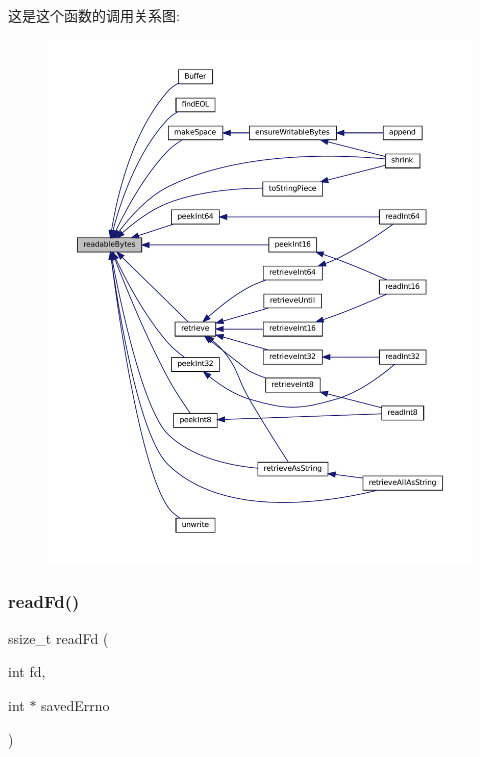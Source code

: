 这是这个函数的调用关系图\+:
\nopagebreak
\begin{figure}[H]
\begin{center}
\leavevmode
\includegraphics[width=350pt]{classmuduo_1_1net_1_1Buffer_afba1d23196411daa43950fdbbff6d724_icgraph}
\end{center}
\end{figure}
\mbox{\label{classmuduo_1_1net_1_1Buffer_abf4ee68d9e5290cdfb7f3854387f0576}} 
\subsubsection{\texorpdfstring{read\+Fd()}{readFd()}}
{\footnotesize\ttfamily ssize\+\_\+t read\+Fd (\begin{DoxyParamCaption}\item[{int}]{fd,  }\item[{int $\ast$}]{saved\+Errno }\end{DoxyParamCaption})}

